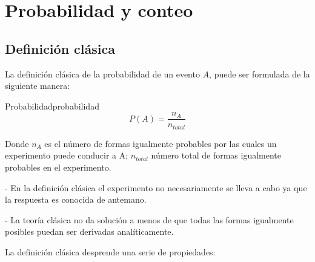 \section{Probabilidad y conteo}

\subsection{Definici\'on cl\'asica}

La definici\'on cl\'asica de la probabilidad \cite{faber2012statistics} de un
evento $A$, puede ser formulada de la siguiente manera:

\begin{theorem}{Probabilidad}{probabilidad}
    \begin{equation}
        P(A)= \frac{n_A}{n_{total}}
    \end{equation}
    \label{eq:probabilidad}
\end{theorem}

Donde $n_A$ es el n\'umero de formas igualmente probables por las cuales un
experimento puede conducir a A; $n_{total}$ n\'umero total de formas igualmente
probables en el experimento.

- En la definici\'on cl\'asica el experimento no necesariamente se lleva a cabo
ya que la respuesta es conocida de antemano.

- La teor\'ia cl\'asica no da soluci\'on a menos de que todas las formas
igualmente posibles puedan ser derivadas anal\'iticamente.

La definición clásica desprende una serie de propiedades:

